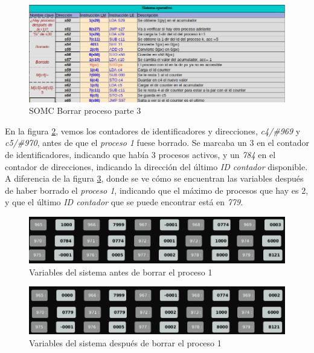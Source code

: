 \documentclass[letterpaper,12pt,oneside]{book}
\begin{document}
		\begin{figure}[h]		
			\centering
			\includegraphics[scale=0.53]{media/CARDIACC/SO_Borrar3.png}
			\caption{ SOMC Borrar proceso parte 3 }
			\label{fig:somcBorrar3}
		\end{figure}		
		
		
		En la figura \ref{fig:ZVBeforeProceso1Erased}, vemos los contadores de identificadores
		y direcciones, \textit{c4/\#969} y \textit{c5/\#970}, antes de que el \textit{proceso 1} fuese borrado.
		Se marcaba un 3 en el contador de identificadores, indicando que había 3 procesos activos,  y un \textit{784} en el contador de direcciones, 
		indicando la dirección del último \textit{ID contador} disponible. A diferencia de la figura \ref{fig:ZVAfterProceso1Erased}, donde se ve cómo 
		se encuentran las variables después de haber borrado el \textit{proceso 1}, indicando que el máximo de procesos que hay es 2, y que  
		el último \textit{ID contador} que se puede encontrar está en \textit{779}.
		
		\begin{figure}[h]		
			\centering
			\includegraphics[scale=0.45]{media/CARDIACC/ZVBeforeProceso1Erased.png}
			\caption{ Variables del sistema antes de borrar el proceso 1}
			\label{fig:ZVBeforeProceso1Erased}
		\end{figure}
		
		\begin{figure}[h]		
			\centering
			\includegraphics[scale=0.45]{media/CARDIACC/ZVAfterProceso1Erased.png}
			\caption{ Variables del sistema después de borrar el proceso 1}
			\label{fig:ZVAfterProceso1Erased}
		\end{figure}
		
\end{document}
